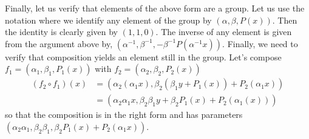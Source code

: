 \documentclass{article}
\begin{document}
Finally, let us verify that elements of the above form are a group. Let us use the notation where we identify any element of the group by \((\alpha, \beta, P(x))\). Then the identity is clearly given by \((1, 1, 0)\). The inverse of any element is given from the argument above by, \((\alpha^{-1}, \beta^{-1}, -\beta^{-1}P(\alpha^{-1}x))\). Finally, we need to verify that composition yields an element still in the group. Let's compose \(f_{1} = (\alpha_{1}, \beta_{1}, P_{1}(x))\) with \(f_{2} = (\alpha_{2}, \beta_{2}, P_{2}(x))\)
\begin{subequations}
\begin{align}
(f_{2}\circ f_{1})(x) & = (\alpha_{2}(\alpha_{1}x), \beta_{2}(\beta_{1}y + P_{1}(x)) + P_{2}(\alpha_{1}x)) \\
 & = (\alpha_{2}\alpha_{1}x, \beta_{2}\beta_{1}y + \beta_{2}P_{1}(x) + P_{2}(\alpha_{1}(x)))
\end{align}
\end{subequations}
so that the composition is in the right form and has parameters \((\alpha_{2}\alpha_{1}, \beta_{2}\beta_{1}, \beta_{2}P_{1}(x) + P_{2}(\alpha_{1}x))\).

\subsection{}

\subsection{}

\subsection{}

\subsection{}

\subsection{}

\subsection{}

\subsection{}
\end{document}
